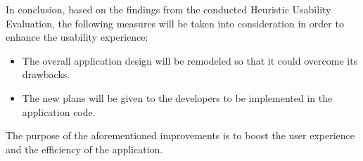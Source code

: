 In conclusion, based on the findings from the conducted Heuristic Usability Evaluation, the following measures will be taken into consideration in order to enhance the usability experience:
\begin{itemize}
    \item The overall application design will be remodeled so that it could overcome its drawbacks.
    \item The new plans will be given to the developers to be implemented in the application code.
\end{itemize}
The purpose of the aforementioned improvements is to boost the user experience and the efficiency of the application.       